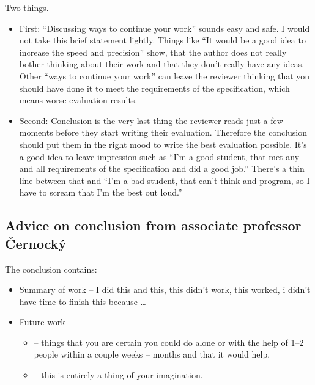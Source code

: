 \begin{samepage}
\noindent Two things.
\begin{itemize}
  \item{First: ``Discussing ways to continue your work'' sounds easy and safe. I would not take this brief statement lightly. Things like ``It would be a good idea to increase the speed and precision'' show, that the author does not really bother thinking about their work and that they don't really have any ideas. Other ``ways to continue your work'' can leave the reviewer thinking that you should have done it to meet the requirements of the specification, which means worse evaluation results.}
  \item{Second: Conclusion is the very last thing the reviewer reads just a few moments before they start writing their evaluation. Therefore the conclusion should put them in the right mood to write the best evaluation possible. It's a good idea to leave impression such as ``I'm a good student, that met any and all requirements of the specification and did a good job.'' There's a thin line between that and ``I'm a bad student, that can't think and program, so I have to scream that I'm the best out loud.''}
\end{itemize}
\end{samepage}

\subsection*{Advice on conclusion from associate professor Černocký}

The conclusion contains:
\begin{itemize}
  \item{Summary of work -- I did this and this, this didn't work, this worked, i didn't have time to finish this because \ldots}
  \item{Future work
    \begin{itemize}
      \item{ -- things that you are certain you could do alone or with the help of 1--2 people within a couple weeks -- months and that it would help.}
      \item{ -- this is entirely a thing of your imagination.}
    \end{itemize}}
\end{itemize}

